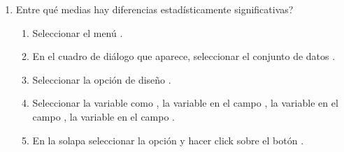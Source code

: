 \begin{enumerate}[leftmargin=*]
\begin{enumerate}
\item Entre qué medias hay diferencias estadísticamente significativas? 
\begin{indicacion}{
\begin{enumerate}
\item Seleccionar el menú .
\item En el cuadro de diálogo que aparece, seleccionar el conjunto de datos .
\item Seleccionar la opción de diseño .
\item Seleccionar la variable  como , la variable
 en el campo , la variable  en el campo
, la variable  en el campo .
\item En la solapa  seleccionar la opción  y hacer
click sobre el botón .
\end{enumerate}
}
\end{indicacion}
\end{enumerate}
\end{enumerate}


